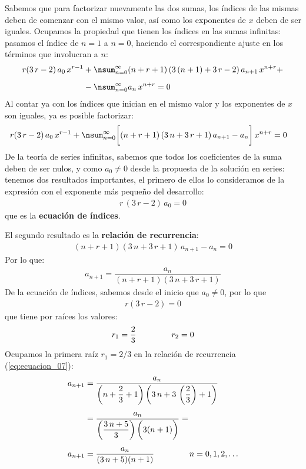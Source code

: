 Sabemos que para factorizar nuevamente las dos sumas, los índices de las mismas deben de comenzar con el mismo valor, así como los exponentes de $x$ deben de ser iguales. Ocupamos la propiedad que tienen los índices en las sumas infinitas: pasamos el índice de $n = 1$ a $n = 0$, haciendo el correspondiente ajuste en los términos que involucran a $n$:
\begin{align*}
r(3 \, r - 2) \, a_{0} \, x^{r-1} &+ \nsum_{n=0}^{\infty} (n + r + 1) \, (3 \, (n + 1) + 3 \, r - 2) \, a_{n+1} \, x^{n+r} + \\[0.5em]
&- \nsum_{n=0}^{\infty} a_{n} \, x^{n+r} = 0
\end{align*}    
Al contar ya con los índices que inician en el mismo valor y los exponentes de $x$ son iguales, ya es posible factorizar:
\begin{align*}
r(3 \, r - 2) \, a_{0} \, x^{r-1} &+ \nsum_{n=0}^{\infty} \bigg[ (n + r + 1) \, (3 \, n + 3 \, r + 1) \, a_{n+1} - a_{n} \bigg] \, x^{n+r} = 0    
\end{align*}
De la teoría de series infinitas, sabemos que todos los coeficientes de la suma deben de ser nulos, y como $a_{0} \neq 0$ desde la propuesta de la solución en series: tenemos dos resultados importantes, el primero de ellos lo consideramos de la expresión con el exponente más pequeño del desarrollo:
\begin{align*}
r \, (3 \, r - 2) \, a_{0} = 0
\end{align*}
que es la \textbf{ecuación de índices}.
\par
El segundo resultado es la \textbf{relación de recurrencia}:
\begin{align*}
(n + r + 1)(3 \, n + 3 \, r + 1) \, a_{n+1} - a_{n} = 0
\end{align*}
Por lo que:
\begin{align}
a_{n+1} = \dfrac{a_{n}}{(n + r + 1)(3 \, n + 3 \, r + 1)}
\label{eq:ecuacion_07}
\end{align}
De la ecuación de índices, sabemos desde el inicio que $a_{0} \neq 0$, por lo que
\begin{align}
r (3 \, r - 2) = 0
\label{eq:ecuacion_06}
\end{align}
que tiene por raíces los valores:
\begin{align*}
r_{1} = \dfrac{2}{3} \hspace{1.5cm} r_{2} = 0
\end{align*}
Ocupamos la primera raíz $r_{1} = 2/3$ en la relación de recurrencia (\ref{eq:ecuacion_07}):
\begin{align}
\begin{aligned}[b]
a_{n+1} &= \dfrac{a_{n}}{ \left( n + \dfrac{2}{3} + 1\right) \left(3 \, n + 3 \, \left( \dfrac{2}{3} \right) + 1\right)} \\[0.5em]
&= \dfrac{a_{n}}{\left( \dfrac{3 \, n + 5}{3} \right) \bigg( 3 (n + 1) \bigg)} = \\[0.5em]
a_{n+1} &= \dfrac{a_{n}}{(3 \, n + 5)(n + 1)} \hspace{1.5cm} n = 0, 1, 2, \ldots
\end{aligned}
\label{eq:ecuacion_08}    
\end{align}

